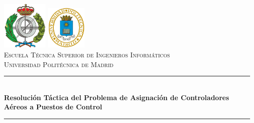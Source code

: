 \documentclass[spanish,12pt, a4paper,twoside]{article}
\begin{document}
    \renewcommand{\listtablename}{Índice de tablas}
    \renewcommand{\tablename}{Tabla}

	\renewcommand\appendixname{Anexo}
	\renewcommand\appendixpagename{Anexos (aún sin completar)}
   	\renewcommand\appendixtocname{Anexos}
   	
    \begin{titlepage}
    
        \newcommand{\HRule}{\rule{\linewidth}{0.5mm}} 

        \center %

        \includegraphics[width=2.25cm]{recursos/logoFi.png}
        \hspace{8cm}
        \includegraphics[width=2cm]{recursos/logoupm.png}
        \\[1cm]

        \textsc{\Large Escuela Técnica Superior de Ingenieros Informáticos}\\[0.5cm]
        \textsc{\large Universidad Politécnica de Madrid}
        \\[3cm]


        \HRule \\[0.4cm]
        { \huge \bfseries Resolución Táctica del Problema de Asignación de Controladores Aéreos a Puestos
        de Control}\\%
        \HRule \\[1.5cm]


\end{titlepage}
\end{document}
